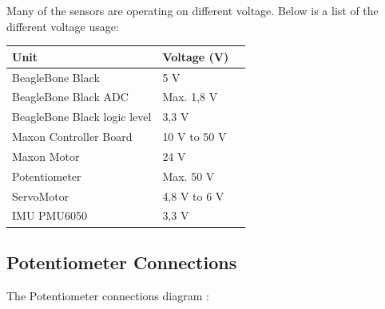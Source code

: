 Many of the sensors are operating on different voltage. Below is a list of the different voltage usage:
\begin{table}[H]
	\centering
	\begin{tabular}{|l|l|p{4.3cm}|}
		\hline%
		\textbf{Unit}       &  \textbf{Voltage (V)}         \\
		\hline%
		BeagleBone Black                               & 5 V           \\
		\hline%
		BeagleBone Black ADC							  & Max. 1,8 V              \\
		\hline%
		BeagleBone Black logic level							  & 3,3 V              \\
		\hline%
		Maxon Controller Board 							  & 10 V to 50 V              \\
		\hline%
		Maxon Motor							  & 24 V             \\
		\hline%
		Potentiometer							  & Max. 50 V              \\
		\hline%
		ServoMotor							  & 4,8 V to 6 V              \\
		\hline%
		IMU PMU6050							  & 3,3 V              \\
		\hline%
	\end{tabular}
\end{table}

\subsection{Potentiometer Connections}
The Potentiometer connections diagram :\\


